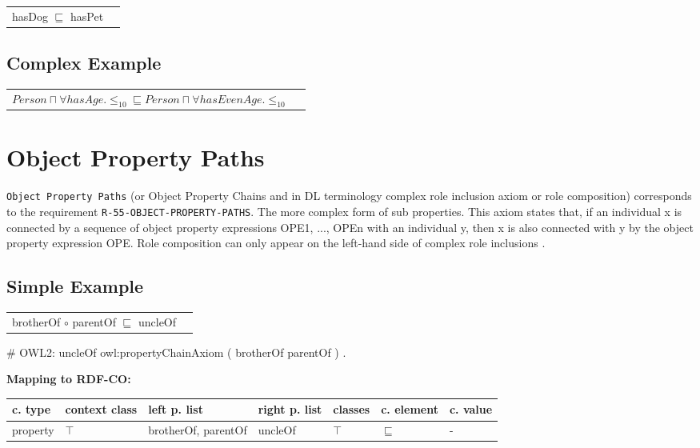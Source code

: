 \documentclass{llncs}
\newcommand{\ms}[1]{\texttt{#1}}
\newenvironment{gcotable}{
  \scriptsize
  \sffamily
  \vspace{0cm}
	\begin{center}
	\textbf{\vspace{0.4cm}Mapping to RDF-CO:} \\
  \begin{tabular}{l|l|l|l|l|l|l}
	\hline
  \textbf{c. type} & \textbf{context class} & \textbf{left p. list} & \textbf{right p. list} & \textbf{classes} & \textbf{c. element} & \textbf{c. value} \\
  \hline

}{
  \hline
  \end{tabular}
	\end{center}
}
\newenvironment{DL}{
  \vspace{0cm}
	\begin{center}
  \begin{tabular}{r l}

}{
  \end{tabular}
	\end{center}
}
\begin{document}
\begin{DL}
hasDog $\sqsubseteq$ hasPet 
\end{DL}



\subsection{Complex Example}

\begin{DL}
 $Person \sqcap  \forall hasAge. \leq_{10} \sqsubseteq Person \sqcap \forall hasEvenAge. \leq_{10}$ 
\end{DL}

\section{Object Property Paths}

\ms{Object Property Paths} (or Object Property Chains and in DL terminology complex role inclusion axiom or role composition)
corresponds to the requirement \ms{R-55-OBJECT-PROPERTY-PATHS}.
The more complex form of sub properties. This axiom states that, if an individual x is connected by a sequence of object property expressions OPE1, ..., OPEn with an individual y, then x is also connected with y by the object property expression OPE.  
Role composition can only appear on the left-hand side of complex role inclusions \cite{Kroetzsch2012}.

\subsection{Simple Example}

\begin{DL}
brotherOf $\circ$ parentOf $\sqsubseteq$ uncleOf 
\end{DL}

\begin{ex}
# OWL2:
uncleOf owl:propertyChainAxiom ( brotherOf parentOf ) . 
\end{ex}

\begin{gcotable}
property & $\top$ & brotherOf, parentOf & uncleOf & $\top$ & $\sqsubseteq$ & -  \\
\end{gcotable}
\end{document}
